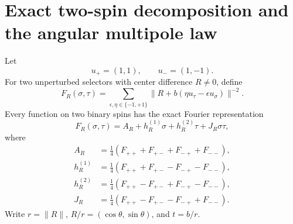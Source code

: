 \documentclass[12pt,a4paper]{article}
\newcommand{\norm}[1]{\lVert #1\rVert}
\newcommand{\sgnspin}{\{-1,+1\}}
\begin{document}
\section{Exact two-spin decomposition and the angular multipole law}\label{sec:multipole}

Let
\[
 u_+=(1,1),\qquad u_-=(1,-1).
\]
For two unperturbed selectors with center difference $R\ne0$, define
\begin{equation}\label{eq:Fst}
 F_R(\sigma,\tau)
 =\sum_{\epsilon,\eta\in\sgnspin}
 \norm{R+b(\eta u_\tau-\epsilon u_\sigma)}^{-2}.
\end{equation}
Every function on two binary spins has the exact Fourier representation
\begin{equation}\label{eq:fourier}
 F_R(\sigma,\tau)=A_R+h_R^{(1)}\sigma+h_R^{(2)}\tau+J_R\sigma\tau,
\end{equation}
where
\begin{align}
 A_R&=\tfrac14(F_{++}+F_{+-}+F_{-+}+F_{--}),\nonumber\\
 h_R^{(1)}&=\tfrac14(F_{++}+F_{+-}-F_{-+}-F_{--}),\nonumber\\
 h_R^{(2)}&=\tfrac14(F_{++}-F_{+-}+F_{-+}-F_{--}),\label{eq:fourier-coeff}\\
 J_R&=\tfrac14(F_{++}-F_{+-}-F_{-+}+F_{--}).\nonumber
\end{align}
Write $r=\norm R$, $R/r=(\cos\theta,\sin\theta)$, and $t=b/r$.
\end{document}
